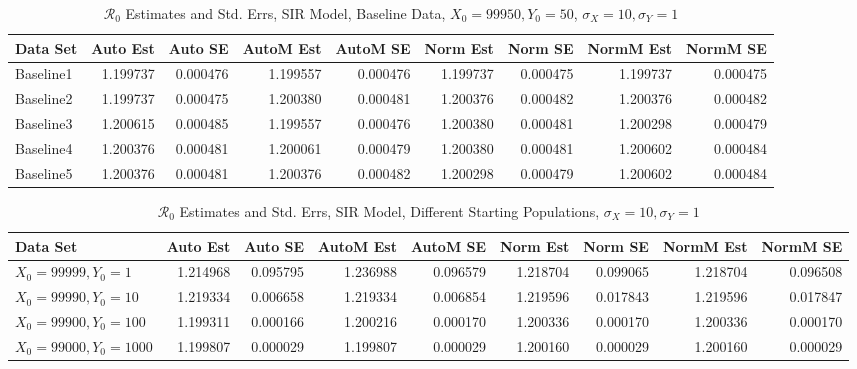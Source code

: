\documentclass[12pt]{article}
\newcommand{\rr}{\ensuremath{\mathcal{R}_0}}
\begin{document}
\begin{table}[H]
	\caption{$\rr$ Estimates and Std. Errs, SIR Model, 
		Baseline Data, $X_0 = 99950, Y_0 = 50$, 
		$\sigma_X = 10, \sigma_Y = 1$}
	\begin{footnotesize}
		\hskip -1cm
		\begin{tabular}{l|r|r|r|r|r|r|r|r}
			\hline
			Data Set & Auto Est & Auto SE & AutoM Est & AutoM SE & Norm Est & Norm SE & NormM Est & NormM SE\\
			\hline
			Baseline1 & 1.199737 & 0.000476 & 1.199557 & 0.000476 & 1.199737 & 0.000475 & 1.199737 & 0.000475\\
			\hline
			Baseline2 & 1.199737 & 0.000475 & 1.200380 & 0.000481 & 1.200376 & 0.000482 & 1.200376 & 0.000482\\
			\hline
			Baseline3 & 1.200615 & 0.000485 & 1.199557 & 0.000476 & 1.200380 & 0.000481 & 1.200298 & 0.000479\\
			\hline
			Baseline4 & 1.200376 & 0.000481 & 1.200061 & 0.000479 & 1.200380 & 0.000481 & 1.200602 & 0.000484\\
			\hline
			Baseline5 & 1.200376 & 0.000481 & 1.200376 & 0.000482 & 1.200298 & 0.000479 & 1.200602 & 0.000484\\
			\hline
		\end{tabular}
	\end{footnotesize}
\end{table}


\begin{table}[H]
	
	\caption{$\rr$ Estimates and Std. Errs, SIR Model,
		Different Starting Populations, 
		$\sigma_X = 10, \sigma_Y = 1$}
	\begin{footnotesize}
		\hskip -1.7cm
		\begin{tabular}{l|r|r|r|r|r|r|r|r}
			\hline
			Data Set & Auto Est & Auto SE & AutoM Est & AutoM SE & Norm Est & Norm SE & NormM Est & NormM SE\\
			\hline
			$X_0 = 99999, Y_0 = 1$ & 1.214968 & 0.095795 & 1.236988 & 0.096579 & 1.218704 & 0.099065 & 1.218704 & 0.096508\\
			\hline
			$X_0 = 99990, Y_0 = 10$ & 1.219334 & 0.006658 & 1.219334 & 0.006854 & 1.219596 & 0.017843 & 1.219596 & 0.017847\\
			\hline
			$X_0 = 99900, Y_0 = 100$ & 1.199311 & 0.000166 & 1.200216 & 0.000170 & 1.200336 & 0.000170 & 1.200336 & 0.000170\\
			\hline
			$X_0 = 99000, Y_0 = 1000$ & 1.199807 & 0.000029 & 1.199807 & 0.000029 & 1.200160 & 0.000029 & 1.200160 & 0.000029\\
			\hline
		\end{tabular}
	\end{footnotesize}
\end{table}
\end{document}
